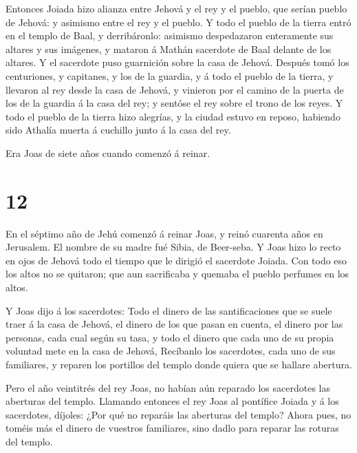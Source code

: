  Entonces Joiada hizo alianza entre Jehová y el rey y el
pueblo, que serían pueblo de Jehová: y asimismo entre el rey y el
pueblo.  Y todo el pueblo de la tierra entró en el templo
de Baal, y derribáronlo: asimismo despedazaron enteramente sus altares y
sus imágenes, y mataron á Mathán sacerdote de Baal delante de los
altares. Y el sacerdote puso guarnición sobre la casa de Jehová.
 Después tomó los centuriones, y capitanes, y los de la
guardia, y á todo el pueblo de la tierra, y llevaron al rey desde la
casa de Jehová, y vinieron por el camino de la puerta de los de la
guardia á la casa del rey; y sentóse el rey sobre el trono de los reyes.
 Y todo el pueblo de la tierra hizo alegrías, y la ciudad
estuvo en reposo, habiendo sido Athalía muerta á cuchillo junto á la
casa del rey.

 Era Joas de siete años cuando comenzó á reinar.

\hypertarget{section-11}{%
\section{12}\label{section-11}}

 En el séptimo año de Jehú comenzó á reinar Joas, y reinó
cuarenta años en Jerusalem. El nombre de su madre fué Sibia, de
Beer-seba.  Y Joas hizo lo recto en ojos de Jehová todo el
tiempo que le dirigió el sacerdote Joiada.  Con todo eso los
altos no se quitaron; que aun sacrificaba y quemaba el pueblo perfumes
en los altos.

 Y Joas dijo á los sacerdotes: Todo el dinero de las
santificaciones que se suele traer á la casa de Jehová, el dinero de los
que pasan en cuenta, el dinero por las personas, cada cual según su
tasa, y todo el dinero que cada uno de su propia voluntad mete en la
casa de Jehová,  Recíbanlo los sacerdotes, cada uno de sus
familiares, y reparen los portillos del templo donde quiera que se
hallare abertura.

 Pero el año veintitrés del rey Joas, no habían aún reparado
los sacerdotes las aberturas del templo.  Llamando entonces
el rey Joas al pontífice Joiada y á los sacerdotes, díjoles: ¿Por qué no
reparáis las aberturas del templo? Ahora pues, no toméis más el dinero
de vuestros familiares, sino dadlo para reparar las roturas del templo.

